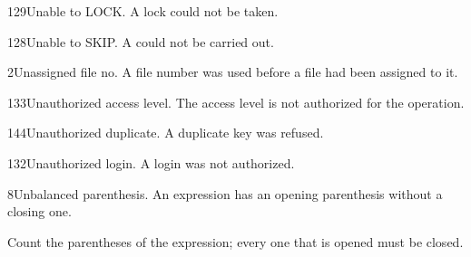 \begin{XbaseMessageEntry}{129}{Unable to LOCK.}
A lock could not be taken.
\end{XbaseMessageEntry}

\begin{XbaseMessageEntry}{128}{Unable to SKIP.}
A  could not be carried out.
\end{XbaseMessageEntry}

\begin{XbaseMessageEntry}{2}{Unassigned file no.}
A file number was used before a file had been assigned to it.
\end{XbaseMessageEntry}

\begin{XbaseMessageEntry}{133}{Unauthorized access level.}
The access level is not authorized for the operation.
\end{XbaseMessageEntry}

\begin{XbaseMessageEntry}{144}{Unauthorized duplicate.}
A duplicate key was refused.
\end{XbaseMessageEntry}

\begin{XbaseMessageEntry}{132}{Unauthorized login.}
A login was not authorized.
\end{XbaseMessageEntry}

\begin{XbaseMessageEntry}{8}{Unbalanced parenthesis.}
An expression has an opening parenthesis without a closing one.

Count the parentheses of the expression; every one that is opened must be closed.
\end{XbaseMessageEntry}

